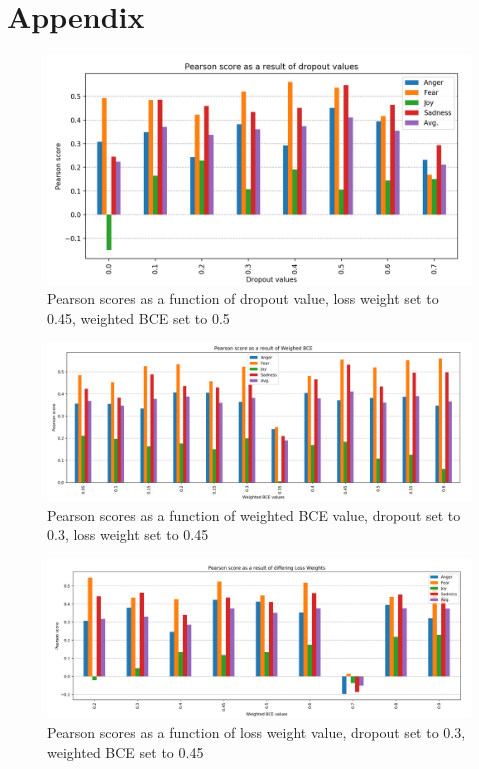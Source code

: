 
\section{Appendix}
\begin{figure}[H]
    \centering
        \includegraphics[width=\textwidth]{pictures/dropoutvalues.png}
        \caption{Pearson scores as a function of dropout value, loss weight set to 0.45, weighted BCE set to 0.5}
        \label{fig:dropoutvalues}
\end{figure}

\begin{figure}[H]
    \centering
        \includegraphics[width=\textwidth]{pictures/weightedBCEvalues.png}
        \caption{Pearson scores as a function of weighted BCE value, dropout set to 0.3, loss weight set to 0.45}
        \label{fig:BCEvalues}
\end{figure}

\begin{figure}[H]
    \centering
        \includegraphics[width=\textwidth]{pictures/LossWeightsvalues.png}
        \caption{Pearson scores as a function of loss weight value, dropout set to 0.3, weighted BCE set to 0.45}
        \label{fig:LWvalues}
\end{figure}

